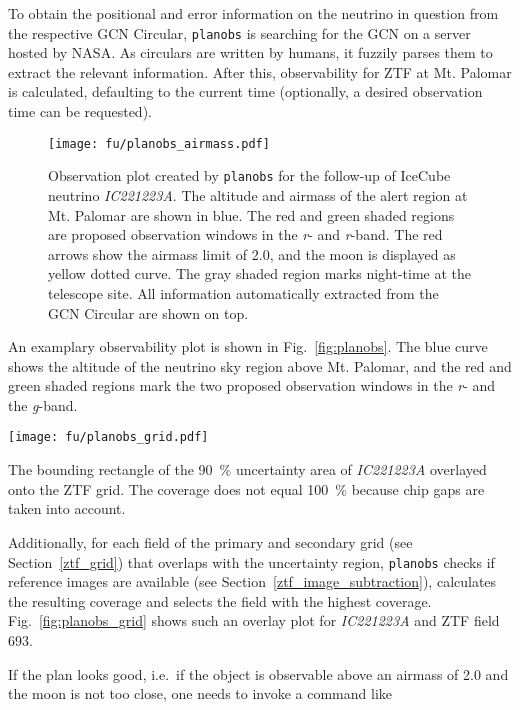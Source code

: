 To obtain the positional and error information on the neutrino in question from the respective GCN Circular, \texttt{planobs} is searching for the GCN on a server hosted by NASA. As circulars are written by humans, it fuzzily parses them to extract the relevant information. After this, observability for ZTF at Mt. Palomar is calculated, defaulting to the current time (optionally, a desired observation time can be requested).

\begin{figure}[h!]
    \texttt{[image: fu/planobs\_airmass.pdf]}
    \caption[Observation plan]{Observation plot created by \texttt{planobs} for the follow-up of IceCube neutrino \textit{IC221223A}. The altitude and airmass of the alert region at Mt. Palomar are shown in blue. The red and green shaded regions are proposed observation windows in the \textit{r}- and \textit{r}-band. The red arrows show the airmass limit of 2.0, and the moon is displayed as yellow dotted curve. The gray shaded region marks night-time at the telescope site. All information automatically extracted from the GCN Circular are shown on top.}
\end{figure}

An examplary observability plot is shown in Fig.~\ref{fig:planobs}. The blue curve shows the altitude of the neutrino sky region above Mt. Palomar, and the red and green shaded regions mark the two proposed observation windows in the \textit{r}- and the \textit{g}-band.

\begin{marginfigure}
    \texttt{[image: fu/planobs\_grid.pdf]}
    \caption[\texttt{planobs} ZTF grid]{The bounding rectangle of the \SI{90}{\percent} uncertainty area of \textit{IC221223A} overlayed onto the ZTF grid. The coverage does not equal \SI{100}{\percent} because chip gaps are taken into account.}
\end{marginfigure}

Additionally, for each field of the primary and secondary grid (see Section~\ref{ztf_grid}) that overlaps with the uncertainty region, \texttt{planobs} checks if reference images are available (see Section~\ref{ztf_image_subtraction}), calculates the resulting coverage and selects the field with the highest coverage. Fig.~\ref{fig:planobs_grid} shows such an overlay plot for \textit{IC221223A} and ZTF field 693.

If the plan looks good, i.e.\ if the object is observable above an airmass of 2.0 and the moon is not too close, one needs to invoke a command like

